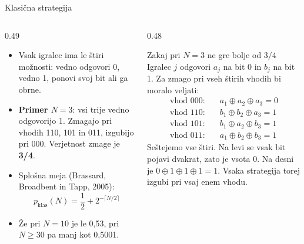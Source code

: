 \documentclass[aspectratio=169,11pt]{beamer}
\newcommand{\poudari}[1]{\textbf{\textcolor{oranzna}{#1}}}
\begin{document}
\begin{frame}{Klasična strategija}
\begin{columns}[T]
\begin{column}{0.49\textwidth}
\begin{itemize}
\item Vsak igralec ima le štiri možnosti: vedno odgovori 0, vedno 1, ponovi svoj bit ali ga obrne.
\item \textbf{Primer $N=3$}: vsi trije vedno odgovorijo 1. Zmagajo pri vhodih 110, 101 in 011, izgubijo pri 000.
      Verjetnost zmage je \poudari{3/4}.
\item Splošna meja (Brassard, Broadbent in Tapp, 2005):
\[
p_\text{klas}(N) = \frac{1}{2} + 2^{-\lceil N/2\rceil}
\]
\item Že pri $N=10$ je le 0,53, pri $N\ge30$ pa manj kot 0,5001.
\end{itemize}
\end{column}
\begin{column}{0.48\textwidth}
\begin{block}{Zakaj pri $N=3$ ne gre bolje od $3/4$}
\small
Igralec $j$ odgovori $a_j$ na bit 0 in $b_j$ na bit 1. Za zmago pri vseh štirih vhodih bi moralo veljati:
\[
\begin{aligned}
\text{vhod 000:}\quad & a_1\oplus a_2\oplus a_3 = 0\\
\text{vhod 110:}\quad & b_1\oplus b_2\oplus a_3 = 1\\
\text{vhod 101:}\quad & b_1\oplus a_2\oplus b_3 = 1\\
\text{vhod 011:}\quad & a_1\oplus b_2\oplus b_3 = 1
\end{aligned}
\]
Seštejemo vse štiri. Na levi se vsak bit pojavi dvakrat, zato je vsota 0. Na desni je $0\oplus1\oplus1\oplus1=1$.
Vsaka strategija torej izgubi pri vsaj enem vhodu.
\end{block}
\end{column}
\end{columns}
\end{frame}
\end{document}
